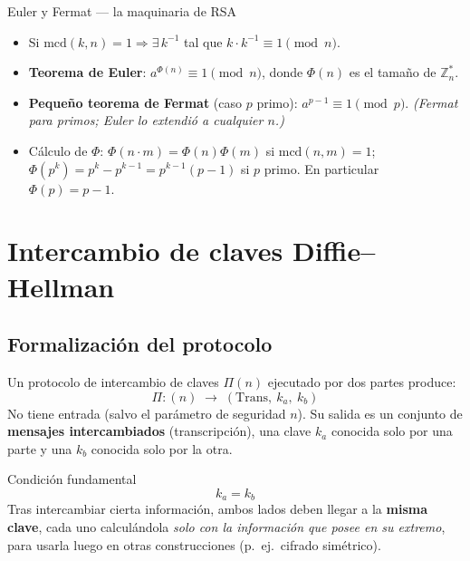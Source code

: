 \documentclass[11pt,a4paper]{article}
\newcommand{\Zn}{\mathbb{Z}}
\newcommand{\mcd}{\mathrm{mcd}}
\begin{document}
\begin{defbox}{Euler y Fermat — la maquinaria de RSA}
\begin{itemize}[leftmargin=1.4em,itemsep=2pt]
  \item Si $\mcd(k,n)=1 \Rightarrow \exists\, k^{-1}$ tal que $k\cdot k^{-1}\equiv 1 \pmod n$.
  \item \textbf{Teorema de Euler}: $a^{\Phi(n)}\equiv 1 \pmod n$, donde $\Phi(n)$ es el tamaño
        de $\Zn_n^{\ast}$.
  \item \textbf{Pequeño teorema de Fermat} (caso $p$ primo): $a^{p-1}\equiv 1 \pmod p$.
        \emph{(Fermat para primos; Euler lo extendió a cualquier $n$.)}
  \item Cálculo de $\Phi$: \quad $\Phi(n\cdot m)=\Phi(n)\Phi(m)$ si $\mcd(n,m)=1$; \quad
        $\Phi(p^k)=p^k-p^{k-1}=p^{k-1}(p-1)$ si $p$ primo. En particular $\Phi(p)=p-1$.
\end{itemize}
\end{defbox}

\section{Intercambio de claves Diffie--Hellman}

\subsection{Formalización del protocolo}
Un protocolo de intercambio de claves $\Pi(n)$ ejecutado por dos partes produce:
\[
  \Pi:(n)\;\to\;(\text{Trans},\ k_a,\ k_b)
\]
No tiene entrada (salvo el parámetro de seguridad $n$). Su salida es un conjunto de
\textbf{mensajes intercambiados} (transcripción), una clave $k_a$ conocida solo por una parte
y una $k_b$ conocida solo por la otra.

\begin{defbox}{Condición fundamental}
\[
  \boxed{k_a = k_b}
\]
Tras intercambiar cierta información, ambos lados deben llegar a la \textbf{misma clave}, cada
uno calculándola \emph{solo con la información que posee en su extremo}, para usarla luego en
otras construcciones (p.\ ej.\ cifrado simétrico).
\end{defbox}
\end{document}
